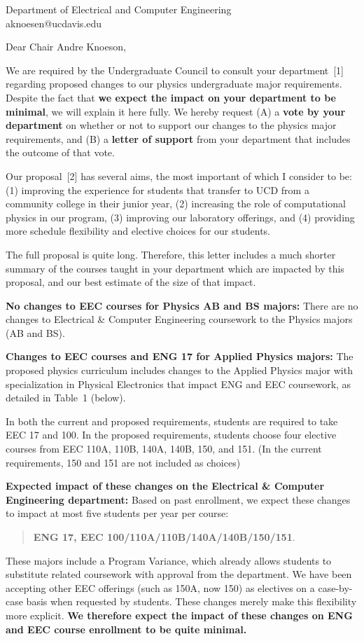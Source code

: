 \documentclass[letterpaper,12pt]{letter}
\def\letterparta{
We are required by the Undergraduate Council to consult your
department~[1] regarding proposed changes to our physics undergraduate major requirements.  Despite the fact that {\bf we expect the
  impact on your department to be minimal}, we will explain it here
fully.  We hereby request (A) a {\bf vote by your department} on
whether or not to support our changes to the physics major
requirements, and (B) a {\bf letter of support} from your department
that includes the outcome of that vote.

Our proposal~[2] has several aims, the most important of which I
consider to be: (1) improving the experience for students that
transfer to UCD from a community college in their junior year, (2)
increasing the role of computational physics in our program, (3)
improving our laboratory offerings, and (4) providing more schedule
flexibility and elective choices for our students.

The full proposal is quite long.  Therefore, this letter includes a
much shorter summary of the courses taught in your department which
are impacted by this proposal, and our best estimate of the size of
that impact.
}
\begin{document}
\begin{letter}{Department of Electrical and Computer Engineering \\ aknoesen@ucdavis.edu}
  
\opening{Dear Chair Andre Knoeson,}

\letterparta

{\bf No changes to EEC courses for Physics AB and BS majors:} There
are no changes to Electrical \& Computer Engineering coursework to the
Physics majors (AB and BS).

{\bf Changes to EEC courses and ENG 17 for Applied Physics majors:}  
The proposed physics curriculum includes changes to the Applied
Physics major with specialization in Physical Electronics that impact
ENG and EEC coursework, as detailed in Table~1 (below).

In both the current and proposed requirements, students are required
to take EEC 17 and 100.  In the proposed requirements, students choose
four elective courses from EEC 110A, 110B, 140A, 140B, 150, and 151.
(In the current requirements, 150 and 151 are not included as choices)

{\bf Expected impact of these changes on the Electrical \& Computer
  Engineering department:} Based on past enrollment, we expect these
changes to impact at most five students per year per course:
\begin{quote}
{\bf ENG 17, EEC 100/110A/110B/140A/140B/150/151}.
\end{quote}

These majors include a Program Variance, which already allows students
to substitute related coursework with approval from the department.
We have been accepting other EEC offerings (such as 150A, now 150) as
electives on a case-by-case basis when requested by students.  These
changes merely make this flexibility more explicit.  {\bf We therefore
  expect the impact of these changes on ENG and EEC course enrollment
  to be quite minimal.}


\end{letter}
\end{document}
